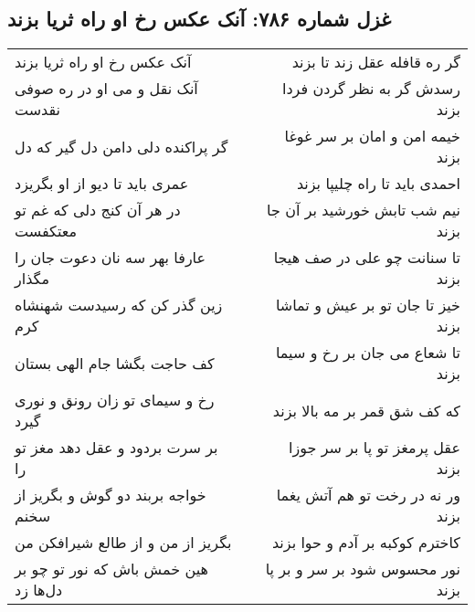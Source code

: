 \begin{center}
\section*{غزل شماره ۷۸۶: آنک عکس رخ او راه ثریا بزند}
\label{sec:0786}
\begin{longtable}{l p{0.5cm} r}
آنک عکس رخ او راه ثریا بزند
&&
گر ره قافله عقل زند تا بزند
\\
آنک نقل و می او در ره صوفی نقدست
&&
رسدش گر به نظر گردن فردا بزند
\\
گر پراکنده دلی دامن دل گیر که دل
&&
خیمه امن و امان بر سر غوغا بزند
\\
عمری باید تا دیو از او بگریزد
&&
احمدی باید تا راه چلیپا بزند
\\
در هر آن کنج دلی که غم تو معتکفست
&&
نیم شب تابش خورشید بر آن جا بزند
\\
عارفا بهر سه نان دعوت جان را مگذار
&&
تا سنانت چو علی در صف هیجا بزند
\\
زین گذر کن که رسیدست شهنشاه کرم
&&
خیز تا جان تو بر عیش و تماشا بزند
\\
کف حاجت بگشا جام الهی بستان
&&
تا شعاع می جان بر رخ و سیما بزند
\\
رخ و سیمای تو زان رونق و نوری گیرد
&&
که کف شق قمر بر مه بالا بزند
\\
بر سرت بردود و عقل دهد مغز تو را
&&
عقل پرمغز تو پا بر سر جوزا بزند
\\
خواجه بربند دو گوش و بگریز از سخنم
&&
ور نه در رخت تو هم آتش یغما بزند
\\
بگریز از من و از طالع شیرافکن من
&&
کاخترم کوکبه بر آدم و حوا بزند
\\
هین خمش باش که نور تو چو بر دل‌ها زد
&&
نور محسوس شود بر سر و بر پا بزند
\\
\end{longtable}
\end{center}
